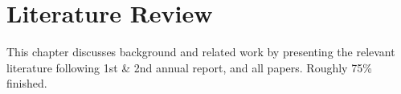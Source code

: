 \chapter{Literature Review}
This chapter discusses background and related work by presenting the relevant literature
following 1st \& 2nd annual report, and all papers.
Roughly 75\% finished.